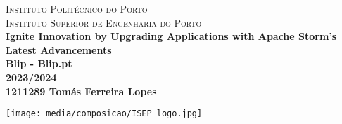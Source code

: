 \begin{titlepage}

\center 

\textsc{
    Instituto Politécnico do Porto\\[3mm]
    \LARGE Instituto Superior de Engenharia do Porto
    }
\HRuleFront
\\[4cm]

{\huge \bfseries Ignite Innovation by Upgrading Applications with Apache Storm's Latest Advancements}\\[.5cm]

{\bfseries Blip - Blip.pt }\\[1cm]
{\Large \bfseries 2023/2024}\\[2cm]

{\Large\bf 1211289 Tomás Ferreira Lopes}


\vfill

\texttt{[image: media/composicao/ISEP\_logo.jpg]}\\

\end{titlepage}

